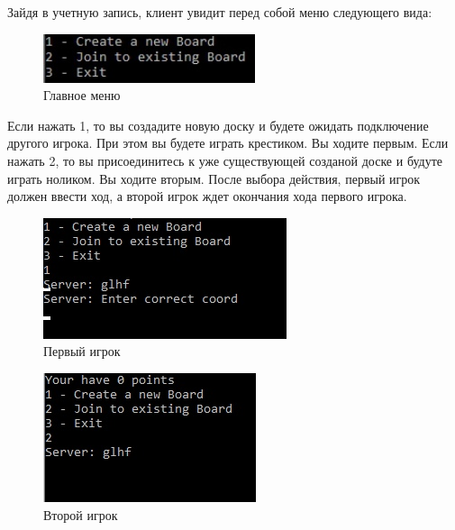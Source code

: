 \documentclass[a4paper,14pt]{extarticle} %
\begin{document}
\newpage
Зайдя в учетную запись, клиент увидит перед собой меню следующего вида:
\begin{figure}[h]
	\centering
	\includegraphics[width=0.8\linewidth]{MENU7.jpg}
	\caption{Главное меню}
	\label{fig:mpr}
\end{figure}

Если нажать 1, то вы создадите новую доску и будете ожидать подключение другого игрока. При этом вы будете играть крестиком. Вы ходите первым.
Если нажать 2, то вы присоединитесь к уже существующей созданой доске и будуте играть ноликом. Вы ходите вторым.
После выбора действия, первый игрок должен ввести ход, а второй игрок ждет окончания хода первого игрока.
\begin{figure}[h]
\centering
\includegraphics[width=0.8\linewidth]{MOVEX8.jpg}
\caption{Первый игрок}
\label{fig:mpr}
\end{figure}
\newpage
\begin{figure}[h]
	\centering
	\includegraphics[width=0.8\linewidth]{MOVEO9.jpg}
	\caption{Второй игрок}
	\label{fig:mpr}
\end{figure}
\end{document}
